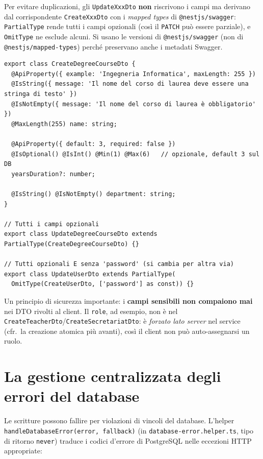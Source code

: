 \documentclass[11pt,a4paper,oneside]{report}
\newcommand{\code}[1]{\texttt{\small #1}}
\newcommand{\file}[1]{\texttt{\small #1}}
\begin{document}
Per evitare duplicazioni, gli \code{UpdateXxxDto} \textbf{non} riscrivono i campi
ma derivano dal corrispondente \code{CreateXxxDto} con i \emph{mapped types} di
\code{@nestjs/swagger}: \code{PartialType} rende tutti i campi opzionali (così il
\code{PATCH} può essere parziale), e \code{OmitType} ne esclude alcuni. Si usano
le versioni di \code{@nestjs/swagger} (non di \code{@nestjs/mapped-types}) perché
preservano anche i metadati Swagger.

\begin{lstlisting}[caption={DTO Create/Update (estratti).}]
export class CreateDegreeCourseDto {
  @ApiProperty({ example: 'Ingegneria Informatica', maxLength: 255 })
  @IsString({ message: 'Il nome del corso di laurea deve essere una stringa di testo' })
  @IsNotEmpty({ message: 'Il nome del corso di laurea è obbligatorio' })
  @MaxLength(255) name: string;

  @ApiProperty({ default: 3, required: false })
  @IsOptional() @IsInt() @Min(1) @Max(6)   // opzionale, default 3 sul DB
  yearsDuration?: number;

  @IsString() @IsNotEmpty() department: string;
}

// Tutti i campi opzionali
export class UpdateDegreeCourseDto extends PartialType(CreateDegreeCourseDto) {}

// Tutti opzionali E senza 'password' (si cambia per altra via)
export class UpdateUserDto extends PartialType(
  OmitType(CreateUserDto, ['password'] as const)) {}
\end{lstlisting}

Un principio di sicurezza importante: i \textbf{campi sensibili non compaiono mai}
nei DTO rivolti al client. Il \code{role}, ad esempio, non è nel
\code{CreateTeacherDto}/\code{CreateSecretariatDto}: è \emph{forzato lato server}
nel service (cfr.\ la creazione atomica più avanti), così il client non può
auto-assegnarsi un ruolo.

\section{La gestione centralizzata degli errori del database}
Le scritture possono fallire per violazioni di vincoli del database. L'helper
\code{handleDatabaseError(error, fallback)} (in \file{database-error.helper.ts},
tipo di ritorno \code{never}) traduce i codici d'errore di PostgreSQL nelle
eccezioni HTTP appropriate:
\end{document}
